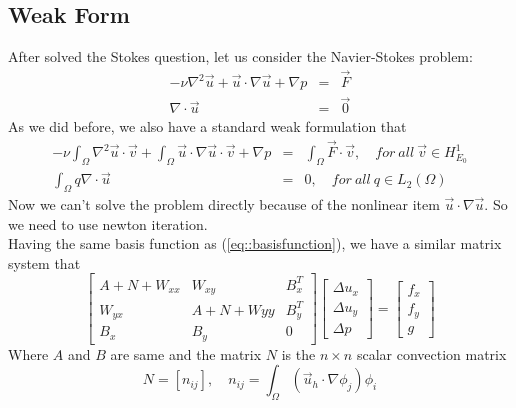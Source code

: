 \documentclass[a4paper]{article}
\begin{document}
\subsection{Weak Form}
After solved the Stokes question, let us consider the Navier-Stokes problem:
\begin{equation}
\begin{array}{rcl}
-\nu \nabla^2 \vec{u} + \vec{u}\cdot \nabla \vec{u} + \nabla p &=& \vec{F} \\
\nabla \cdot \vec{u} &=& \vec{0}
\label{eq::Navier-Stokes-problem}
\end{array}
\end{equation}
As we did before, we also have a standard weak formulation that
\begin{equation}
\begin{array}{rcl}
-\nu\int_\Omega \nabla^2 \vec{u} \cdot \vec{v}+\int_{\Omega}\vec{u}\cdot\nabla\vec{u}\cdot\vec{v} + \nabla p &=& \int_{\Omega}\vec{F}\cdot \vec{v},\quad for \ all \ \vec{v} \in H^1_{E_0} \\
\int_\Omega q\nabla \cdot \vec{u} &=&0,\quad for \ all \ q \in L_2(\Omega)
\label{eq::Navier-Stokes-weakform}
\end{array}
\end{equation}
Now we can't solve the problem directly because of the nonlinear item $\vec{u}\cdot \nabla \vec{u}$. So we need to use newton iteration.\\
\indent Having the same basis function as (\ref{eq::basisfunction}), we have a similar matrix system that
\begin{equation}
\left[ \begin{array}{ccc}
A + N +W_{xx} & W_{xy} & B_x^T \\
W_{yx} & A +N +W{yy}& B_y^T \\
B_x & B_y & 0
\end{array}
\right]
\left[\begin{array}{ccc}
\Delta u_x\\
\Delta u_y\\
\Delta p
\end{array}
\right]=
\left[\begin{array}{ccc}
f_x\\
f_y\\
g
\end{array}
\right]
\label{Navier-Stokes}
\end{equation}
Where $A$ and $B$ are same and the matrix $N$ is the $n\times n$ scalar convection matrix
\begin{equation}
N = [n_{ij}], \quad n_{ij} = \int_{\Omega} (\vec{u}_h\cdot \nabla\phi_j)\phi_i
\label{mt::N}
\end{equation}
\end{document}
